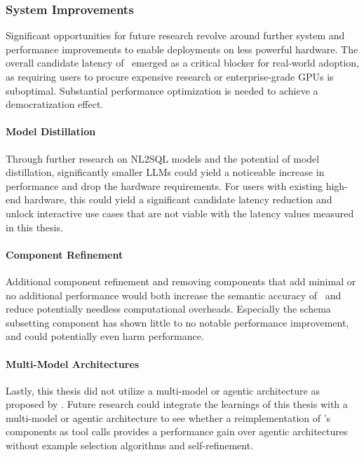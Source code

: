 \subsubsection{System Improvements}

Significant opportunities for future research revolve around further system and
performance improvements to enable deployments on less powerful hardware. The
overall candidate latency of \Natural~emerged as a critical blocker for
real-world adoption, as requiring users to procure expensive research or
enterprise-grade GPUs is suboptimal. Substantial performance optimization is
needed to achieve a democratization effect.

\paragraph{Model Distillation}

Through further research on NL2SQL models and the potential of model
distillation, significantly smaller LLMs could yield a noticeable increase in
performance and drop the hardware requirements. For users with existing
high-end hardware, this could yield a significant candidate latency reduction
and unlock interactive use cases that are not viable with the latency values
measured in this thesis.

\paragraph{Component Refinement}

Additional component refinement and removing components
that add minimal or no additional performance would both increase
the semantic accuracy of \Natural~and reduce potentially needless
computational overheads. Especially the schema subsetting component has shown
little to no notable performance improvement, and could potentially even
harm performance.

\paragraph{Multi-Model Architectures}

Lastly, this thesis did not utilize a multi-model or agentic architecture as
proposed by \cite{XiYan}. Future research could integrate the learnings of this
thesis with a multi-model or agentic architecture to see whether a
reimplementation of \Natural's components as tool calls provides a
performance gain over agentic architectures without example selection
algorithms and self-refinement.

